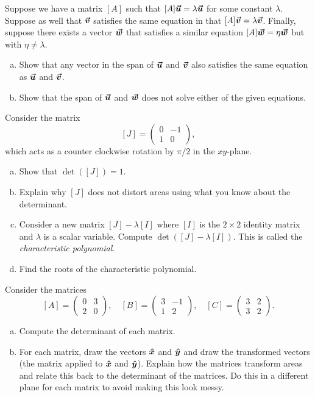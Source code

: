 \documentclass[12pt]{article} %
\begin{document}
\begin{problem}
Suppose we have a matrix $[A]$ such that $[A]\boldsymbol{\boldsymbol{\vec{u}}} = \lambda \boldsymbol{\boldsymbol{\vec{u}}}$ for some constant $\lambda$.  Suppose as well that $\boldsymbol{\boldsymbol{\vec{v}}}$ satisfies the same equation in that $[A]\boldsymbol{\boldsymbol{\vec{v}}} = \lambda \boldsymbol{\boldsymbol{\vec{v}}}$.  Finally, suppose there exists a vector $\boldsymbol{\boldsymbol{\vec{w}}}$ that satisfies a similar equation $[A]\boldsymbol{\boldsymbol{\vec{w}}} = \eta \boldsymbol{\boldsymbol{\vec{w}}}$ but with $\eta\neq \lambda$.
\begin{enumerate}[(a)]
    \item Show that any vector in the span of $\boldsymbol{\boldsymbol{\vec{u}}}$ and $\boldsymbol{\boldsymbol{\vec{v}}}$ also satisfies the same equation as $\boldsymbol{\boldsymbol{\vec{u}}}$ and $\boldsymbol{\boldsymbol{\vec{v}}}$.
    \item Show that the span of $\boldsymbol{\boldsymbol{\vec{u}}}$ and $\boldsymbol{\boldsymbol{\vec{w}}}$ does not solve either of the given equations.
\end{enumerate}
\end{problem}

\begin{problem}
Consider the matrix 
\[
[J] = \begin{pmatrix} 0 & -1 \\ 1 & 0 \end{pmatrix},
\]
which acts as a counter clockwise rotation by $\pi/2$ in the $xy$-plane.  
\begin{enumerate}[(a)]
    \item Show that $\det([J])=1$.
    \item Explain why $[J]$ does not distort areas using what you know about the determinant.
    \item Consider a new matrix $[J]-\lambda [I]$ where $[I]$ is the $2\times 2$ identity matrix and $\lambda$ is a scalar variable.  Compute $\det([J]-\lambda [I])$. This is called the \emph{characteristic polynomial}.
    \item Find the roots of the characteristic polynomial.
\end{enumerate}
\end{problem}

\begin{problem}
Consider the matrices
\[
[A] = \begin{pmatrix} 0 & 3 \\ 2 & 0 \end{pmatrix}, \quad [B] = \begin{pmatrix} 3 & -1 \\ 1 & 2 \end{pmatrix}, \quad [C] = \begin{pmatrix} 3 & 2 \\ 3 & 2 \end{pmatrix}.
\]
\begin{enumerate}[(a)]
    \item Compute the determinant of each matrix.
    \item For each matrix, draw the vectors $\boldsymbol{\hat{x}}$ and $\boldsymbol{\hat{y}}$ and draw the transformed vectors (the matrix applied to $\boldsymbol{\hat{x}}$ and $\boldsymbol{\hat{y}}$). Explain how the matrices transform areas and relate this back to the determinant of the matrices.  Do this in a different plane for each matrix to avoid making this look messy.
\end{enumerate}
\end{problem}
\end{document}
